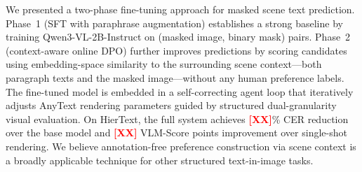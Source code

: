 \documentclass[uplatex,10pt,twocolumn,a4paper]{article}
\newcommand{\TODO}[1]{\textcolor{red}{\textbf{[#1]}}}
\begin{document}
We presented a two-phase fine-tuning approach for masked scene text
prediction.
Phase~1 (SFT with paraphrase augmentation) establishes a strong
baseline by training Qwen3-VL-2B-Instruct on (masked image, binary
mask) pairs.
Phase~2 (context-aware online DPO) further improves predictions by
scoring candidates using embedding-space similarity to the surrounding
scene context---both paragraph texts and the masked image---without any
human preference labels.
The fine-tuned model is embedded in a self-correcting agent loop that
iteratively adjusts AnyText rendering parameters guided by structured
dual-granularity visual evaluation.
On HierText, the full system achieves \TODO{XX}\% CER reduction over
the base model and \TODO{XX} VLM-Score points improvement over
single-shot rendering.
We believe annotation-free preference construction via scene context is
a broadly applicable technique for other structured text-in-image tasks.
\end{document}
